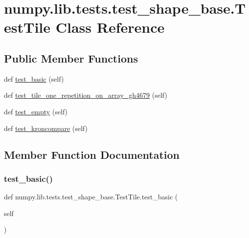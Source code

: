 \hypertarget{classnumpy_1_1lib_1_1tests_1_1test__shape__base_1_1TestTile}{}\section{numpy.\+lib.\+tests.\+test\+\_\+shape\+\_\+base.\+Test\+Tile Class Reference}
\label{classnumpy_1_1lib_1_1tests_1_1test__shape__base_1_1TestTile}
\subsection*{Public Member Functions}
\begin{DoxyCompactItemize}
\item 
def \hyperlink{classnumpy_1_1lib_1_1tests_1_1test__shape__base_1_1TestTile_a0e6a7634a87acf74686808648e14735b}{test\+\_\+basic} (self)
\item 
def \hyperlink{classnumpy_1_1lib_1_1tests_1_1test__shape__base_1_1TestTile_a95efcc4aac2fa0f319a47f6e2bc05277}{test\+\_\+tile\+\_\+one\+\_\+repetition\+\_\+on\+\_\+array\+\_\+gh4679} (self)
\item 
def \hyperlink{classnumpy_1_1lib_1_1tests_1_1test__shape__base_1_1TestTile_ae0647fb92991c6ae708255d5b862f3e3}{test\+\_\+empty} (self)
\item 
def \hyperlink{classnumpy_1_1lib_1_1tests_1_1test__shape__base_1_1TestTile_abbfbef3a0b0d37a629a450070b1c145b}{test\+\_\+kroncompare} (self)
\end{DoxyCompactItemize}


\subsection{Member Function Documentation}
\mbox{\label{classnumpy_1_1lib_1_1tests_1_1test__shape__base_1_1TestTile_a0e6a7634a87acf74686808648e14735b}} 
\subsubsection{\texorpdfstring{test\+\_\+basic()}{test\_basic()}}
{\footnotesize\ttfamily def numpy.\+lib.\+tests.\+test\+\_\+shape\+\_\+base.\+Test\+Tile.\+test\+\_\+basic (\begin{DoxyParamCaption}\item[{}]{self }\end{DoxyParamCaption})}

